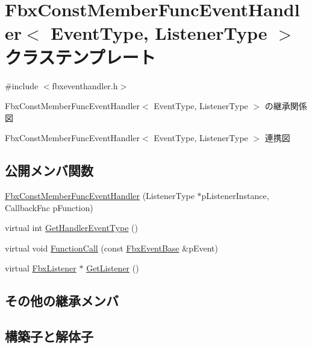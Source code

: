 \hypertarget{class_fbx_const_member_func_event_handler}{}\section{Fbx\+Const\+Member\+Func\+Event\+Handler$<$ Event\+Type, Listener\+Type $>$ クラステンプレート}
\label{class_fbx_const_member_func_event_handler}


{\ttfamily \#include $<$fbxeventhandler.\+h$>$}



Fbx\+Const\+Member\+Func\+Event\+Handler$<$ Event\+Type, Listener\+Type $>$ の継承関係図


Fbx\+Const\+Member\+Func\+Event\+Handler$<$ Event\+Type, Listener\+Type $>$ 連携図
\subsection*{公開メンバ関数}
\begin{DoxyCompactItemize}
\item 
\hyperlink{class_fbx_const_member_func_event_handler_ae3bd1e1775d0126faa06efe6ffda1211}{Fbx\+Const\+Member\+Func\+Event\+Handler} (Listener\+Type $\ast$p\+Listener\+Instance, Callback\+Fnc p\+Function)
\item 
virtual int \hyperlink{class_fbx_const_member_func_event_handler_ac88157f51fa72cba959f31dfbcdee4a5}{Get\+Handler\+Event\+Type} ()
\item 
virtual void \hyperlink{class_fbx_const_member_func_event_handler_ae6c6805404e8045de40289893709dc54}{Function\+Call} (const \hyperlink{class_fbx_event_base}{Fbx\+Event\+Base} \&p\+Event)
\item 
virtual \hyperlink{class_fbx_listener}{Fbx\+Listener} $\ast$ \hyperlink{class_fbx_const_member_func_event_handler_a9e370edd4a746ef5098d39a4f9c3d63c}{Get\+Listener} ()
\end{DoxyCompactItemize}
\subsection*{その他の継承メンバ}


\subsection{構築子と解体子}
\mbox{\label{class_fbx_const_member_func_event_handler_ae3bd1e1775d0126faa06efe6ffda1211}} 
